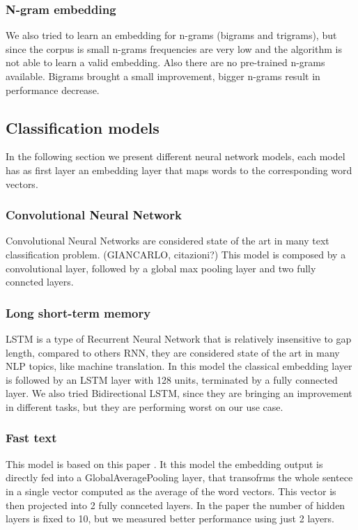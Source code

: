 \subsubsection{N-gram embedding}
We also tried to learn an embedding for n-grams (bigrams and trigrams), but since the corpus is small n-grams frequencies are very low and the algorithm is not able to learn a valid embedding.
Also there are no pre-trained n-grams available.
Bigrams brought a small improvement, bigger n-grams result in performance decrease.





\subsection{Classification models} \label{subsec:classificationModel}
In the following section we present different neural network models, each model has as first layer an embedding layer that maps words to the corresponding word vectors.


\subsubsection{Convolutional Neural Network}
Convolutional Neural Networks are considered state of the art in many text classification problem. (GIANCARLO, citazioni?)
This model is composed by a convolutional layer, followed by a global max pooling layer and two fully conncted layers.

\subsubsection{Long short-term memory}
LSTM is a type of Recurrent Neural Network that is relatively insensitive to gap length, compared to others RNN, they are considered state of the art in many NLP topics, like machine translation.
In this model the classical embedding layer is followed by an LSTM layer with 128 units, terminated by a fully connected layer.
We also tried Bidirectional LSTM, since they are bringing an improvement in different tasks, but they are performing worst on our use case.

\subsubsection{Fast text}
This model is based on this paper \cite{joulin2016bag}. It this model the embedding output is directly fed into a GlobalAveragePooling layer, that transofrms the whole sentece in a single vector computed as the average of the word vectors.
This vector is then projected into 2 fully connceted layers. In the paper the number of hidden layers is fixed to 10, but we measured better performance using just 2 layers.

